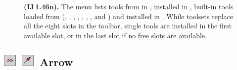 \begin{figure}
\caption[\emph{More Tools} list]{\label{fig:MoreToolsList}\textbf{ (IJ\,1.46n).}
The menu lists tools from \protect{}
in \protect{}, 
installed in \protect{}, built-in
tools loaded from \protect{} (,
, , ,
, , ,
 and ) and 
installed in \protect{}. While toolsets
replace all the eight slots in the toolbar, single tools are installed
in the first available slot, or in the last slot if no free slots
are available.}
\end{figure}



\subsection[Arrow]{\noindent \textsf{\protect\includegraphics[bb=0bp 5bp 20bp 20bp,scale=0.6]{images/tools/Switcher}}~\textsf{\protect\includegraphics[bb=0bp 5bp 20bp 20bp,scale=0.6]{images/tools/Arrow2}}~Arrow\textmd{}\label{sub:ArrowTool2}\textmd{}\feature{}}

